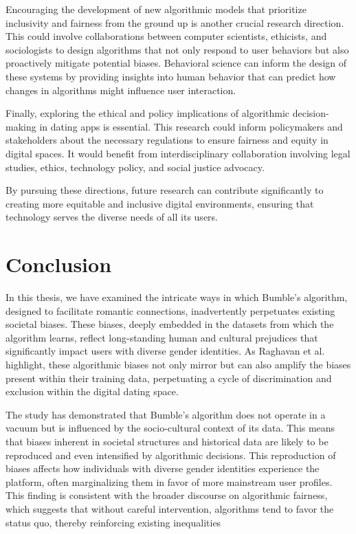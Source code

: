 Encouraging the development of new algorithmic models that prioritize inclusivity and fairness from the ground up is another crucial research direction. This could involve collaborations between computer scientists, ethicists, and sociologists to design algorithms that not only respond to user behaviors but also proactively mitigate potential biases. Behavioral science can inform the design of these systems by providing insights into human behavior that can predict how changes in algorithms might influence user interaction.

Finally, exploring the ethical and policy implications of algorithmic decision-making in dating apps is essential. This research could inform policymakers and stakeholders about the necessary regulations to ensure fairness and equity in digital spaces. It would benefit from interdisciplinary collaboration involving legal studies, ethics, technology policy, and social justice advocacy.

By pursuing these directions, future research can contribute significantly to creating more equitable and inclusive digital environments, ensuring that technology serves the diverse needs of all its users.

\section{Conclusion}
In this thesis, we have examined the intricate ways in which Bumble's algorithm, designed to facilitate romantic connections, inadvertently perpetuates existing societal biases. These biases, deeply embedded in the datasets from which the algorithm learns, reflect long-standing human and cultural prejudices that significantly impact users with diverse gender identities. As Raghavan et al. \cite{Raghavan_Barocas_Kleinberg_Levy_2019} highlight, these algorithmic biases not only mirror but can also amplify the biases present within their training data, perpetuating a cycle of discrimination and exclusion within the digital dating space.

The study has demonstrated that Bumble's algorithm does not operate in a vacuum but is influenced by the socio-cultural context of its data. This means that biases inherent in societal structures and historical data are likely to be reproduced and even intensified by algorithmic decisions. This reproduction of biases affects how individuals with diverse gender identities experience the platform, often marginalizing them in favor of more mainstream user profiles. This finding is consistent with the broader discourse on algorithmic fairness, which suggests that without careful intervention, algorithms tend to favor the status quo, thereby reinforcing existing inequalities \cite{heidivellastarr_2022}

